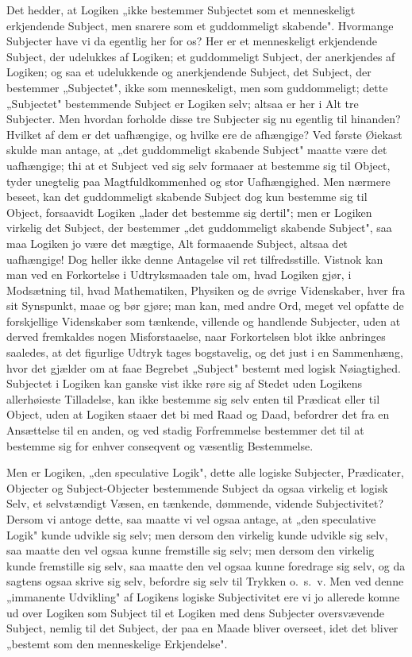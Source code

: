 \documentclass[12pt]{book}
\newcommand{\opage}[1]{\marginnote{\footnotesize\textit{[#1]}}}
\begin{document}
Det hedder, at Logiken „ikke bestemmer Subjectet som et menneskeligt erkjendende
Subject, men snarere som et guddommeligt skabende". Hvormange Subjecter have vi
da egentlig her for os? Her er et menneskeligt erkjendende Subject, der udelukkes
af Logiken; et guddommeligt Subject, der anerkjendes af Logiken; og saa et
udelukkende og anerkjendende Subject, det Subject, der bestemmer „Subjectet",
ikke som menneskeligt, men som guddommeligt; dette „Subjectet" bestemmende
Subject er Logiken selv; altsaa er her i Alt tre Subjecter. Men hvordan forholde
disse tre Subjecter sig nu egentlig til hinanden? Hvilket af dem er det
uafhængige, og hvilke ere de afhængige? Ved første Øiekast skulde man antage, at
„det guddommeligt skabende Subject" maatte være det uafhængige; thi at et Subject
ved sig selv formaaer at bestemme sig til Object, tyder unegtelig paa
Magtfuldkommenhed og stor Uafhængighed. Men nærmere beseet, kan det guddommeligt
skabende Subject dog kun bestemme sig til Object,
\opage{41} forsaavidt Logiken „lader det bestemme sig dertil"; men er Logiken virkelig det
Subject, der bestemmer „det guddommeligt skabende Subject", saa maa Logiken jo
være det mægtige, Alt formaaende Subject, altsaa det uafhængige! Dog heller ikke
denne Antagelse vil ret tilfredsstille. Vistnok kan man ved en Forkortelse i
Udtryksmaaden tale om, hvad Logiken gjør, i Modsætning til, hvad Mathematiken,
Physiken og de øvrige Videnskaber, hver fra sit Synspunkt, maae og bør gjøre; man
kan, med andre Ord, meget vel opfatte de forskjellige Videnskaber som tænkende,
villende og handlende Subjecter, uden at derved fremkaldes nogen Misforstaaelse,
naar Forkortelsen blot ikke anbringes saaledes, at det figurlige Udtryk tages
bogstavelig, og det just i en Sammenhæng, hvor det gjælder om at faae Begrebet
„Subject" bestemt med logisk Nøiagtighed. Subjectet i Logiken kan ganske vist
ikke røre sig af Stedet uden Logikens allerhøieste Tilladelse, kan ikke bestemme
sig selv enten til Prædicat eller til Object, uden at Logiken staaer det bi med
Raad og Daad, befordrer det fra en Ansættelse til en anden, og ved stadig
Forfremmelse bestemmer det til at bestemme sig for enhver conseqvent og væsentlig
Bestemmelse.

Men er Logiken, „den speculative Logik", dette alle logiske Subjecter,
Prædicater, Objecter og Subject-Objecter bestemmende Subject da ogsaa virkelig et
logisk Selv, et selvstændigt Væsen, en tænkende, dømmende, vidende Subjectivitet?
Dersom vi antoge dette, saa maatte vi vel ogsaa antage, at „den speculative
Logik" kunde udvikle sig selv; men dersom den virkelig kunde udvikle sig selv,
saa maatte den vel ogsaa kunne fremstille sig selv; men dersom den virkelig kunde
fremstille sig selv, saa maatte den vel ogsaa kunne foredrage sig selv, og da
sagtens ogsaa skrive sig selv, befordre sig selv til Trykken o.~s.~v. Men ved
denne „immanente Udvikling" af Logikens logiske Subjectivitet ere
\opage{42} vi jo allerede komne ud over Logiken som Subject til et Logiken med dens
Subjecter oversvævende Subject, nemlig til det Subject, der paa en Maade bliver
overseet, idet det bliver „bestemt som den menneskelige Erkjendelse".
\end{document}

